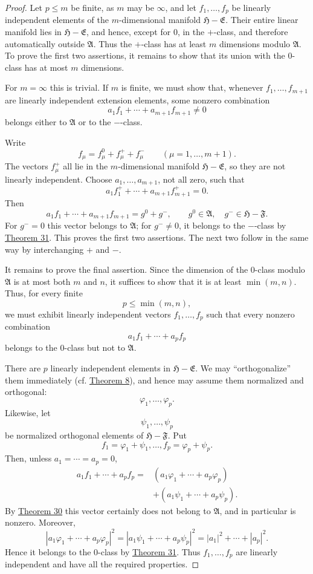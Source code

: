 ﻿\documentclass[paper=b5,fontsize=13pt,bookmarkpackage=false,twoside]{scrartcl}
\begin{document}
\begin{proof}
Let $p\le m$ be finite, as $m$ may be $\infty$, and let $f_1,\ldots,f_p$ be linearly independent elements of the $m$-dimensional manifold $\mathfrak H-\mathfrak E$. Their entire linear manifold lies in $\mathfrak H-\mathfrak E$, and hence, except for $0$, in the $+$-class, and therefore automatically outside $\mathfrak A$. Thus the $+$-class has at least $m$ dimensions modulo $\mathfrak A$. To prove the first two assertions, it remains to show that its union with the $0$-class has at most $m$ dimensions.

For $m=\infty$ this is trivial. If $m$ is finite, we must show that, whenever $f_1,\ldots,f_{m+1}$ are linearly independent extension elements, some nonzero combination
\[
a_1f_1+\cdots+a_{m+1}f_{m+1}\ne0
\]
belongs either to $\mathfrak A$ or to the $-$-class.

Write
\[
f_\mu=f_\mu^0+f_\mu^++f_\mu^-
\qquad(\mu=1,\ldots,m+1).
\]
The vectors $f_\mu^+$ all lie in the $m$-dimensional manifold $\mathfrak H-\mathfrak E$, so they are not linearly independent. Choose $a_1,\ldots,a_{m+1}$, not all zero, such that
\[
a_1f_1^++\cdots+a_{m+1}f_{m+1}^+=0.
\]
Then
\[
a_1f_1+\cdots+a_{m+1}f_{m+1}=g^0+g^-,
\qquad
g^0\in\mathfrak A,\quad
g^-\in\mathfrak H-\mathfrak F.
\]
For $g^-=0$ this vector belongs to $\mathfrak A$; for $g^-\ne0$, it belongs to the $-$-class by \hyperref[thm:31]{Theorem 31}. This proves the first two assertions. The next two follow in the same way by interchanging $+$ and $-$.

It remains to prove the final assertion. Since the dimension of the $0$-class modulo $\mathfrak A$ is at most both $m$ and $n$, it suffices to show that it is at least $\min(m,n)$. Thus, for every finite
\[
p\le\min(m,n),
\]
we must exhibit linearly independent vectors $f_1,\ldots,f_p$ such that every nonzero combination
\[
a_1f_1+\cdots+a_pf_p
\]
belongs to the $0$-class but not to $\mathfrak A$.

There are $p$ linearly independent elements in $\mathfrak H-\mathfrak E$. We may ``orthogonalize'' them immediately (cf. \hyperref[thm:8]{Theorem 8}), and hence may assume them normalized and orthogonal:
\[
\varphi_1,\ldots,\varphi_p.
\]
Likewise, let
\[
\psi_1,\ldots,\psi_p
\]
be normalized orthogonal elements of $\mathfrak H-\mathfrak F$. Put
\[
f_1=\varphi_1+\psi_1,\ldots,f_p=\varphi_p+\psi_p.
\]
Then, unless $a_1=\cdots=a_p=0$,
\begin{align*}
a_1f_1+\cdots+a_pf_p
={}&(a_1\varphi_1+\cdots+a_p\varphi_p)\\
 &+(a_1\psi_1+\cdots+a_p\psi_p).
\end{align*}
By \hyperref[thm:30]{Theorem 30} this vector certainly does not belong to $\mathfrak A$, and in particular is nonzero. Moreover,
\[
|a_1\varphi_1+\cdots+a_p\varphi_p|^2
=|a_1\psi_1+\cdots+a_p\psi_p|^2
=|a_1|^2+\cdots+|a_p|^2.
\]
Hence it belongs to the $0$-class by \hyperref[thm:31]{Theorem 31}. Thus $f_1,\ldots,f_p$ are linearly independent and have all the required properties.
\end{proof}
\end{document}
